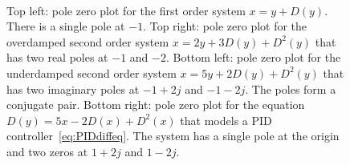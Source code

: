 \begin{figure}[tp]
  \centering
  \;\;\;
  \\ \vspace{0.3cm}
  \;\;\;
  \caption{Top left: pole zero plot for the first order system $x = y + D(y)$.  There is a single pole at $-1$. Top right: pole zero plot for the overdamped second order system $x = 2y + 3D(y) + D^2(y)$ that has two real poles at $-1$ and $-2$. Bottom left: pole zero plot for the underdamped second order system $x = 5y + 2 D(y) + D^2(y)$ that has two imaginary poles at $-1+2j$ and $-1-2j$.  The poles form a conjugate pair.  Bottom right: pole zero plot for the equation $D(y) =  5 x - 2 D(x) + D^2(x)$ that models a PID controller~\eqref{eq:PIDdiffeq}.  The system has a single pole at the origin and two zeros at $1+2j$ and $1-2j$. }\label{fig:polezeroplot}
\end{figure}


